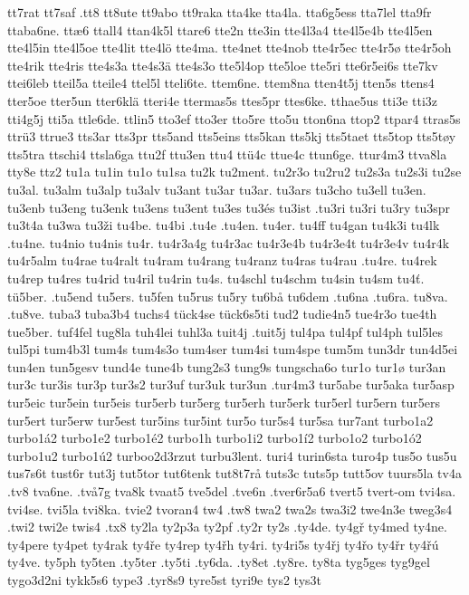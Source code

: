 {{tt7rat
tt7saf
.tt8
tt8ute
tt9abo
tt9raka
tta4ke
tta4la.
tta6g5ess
tta7lel
tta9fr
ttaba6ne.
ttæ6
ttall4
ttan4k5l
ttare6
tte2n
tte3in
tte4l3a4
tte4l5e4b
tte4l5en
tte4l5in
tte4l5oe
tte4lit
tte4lö
tte4ma.
tte4net
tte4nob
tte4r5ec
tte4r5ø
tte4r5oh
tte4rik
tte4ris
tte4s3a
tte4s3ä
tte4s3o
tte5l4op
tte5loe
tte5ri
tte6r5ei6s
tte7kv
ttei6leb
tteil5a
tteile4
ttel5l
tteli6te.
ttem6ne.
ttem8na
tten4t5j
tten5s
ttens4
tter5oe
tter5un
tter6klä
tteri4e
ttermas5s
ttes5pr
ttes6ke.
tthae5us
tti3e
tti3z
tti4g5j
tti5a
ttle6de.
ttlin5
tto3ef
tto3er
tto5re
tto5u
tton6na
ttop2
ttpar4
ttras5s
ttrü3
ttrue3
tts3ar
tts3pr
tts5and
tts5eins
tts5kan
tts5kj
tts5taet
tts5top
tts5tøy
tts5tra
ttschi4
ttsla6ga
ttu2f
ttu3en
ttu4
ttü4c
ttue4c
ttun6ge.
ttur4m3
ttva8la
tty8e
ttz2
tu1a
tu1in
tu1o
tu1sa
tu2k
tu2ment.
tu2r3o
tu2ru2
tu2s3a
tu2s3i
tu2se
tu3al.
tu3alm
tu3alp
tu3alv
tu3ant
tu3ar
tu3ar.
tu3ars
tu3cho
tu3ell
tu3en.
tu3enb
tu3eng
tu3enk
tu3ens
tu3ent
tu3es
tu3és
tu3ist
.tu3ri
tu3ri
tu3ry
tu3spr
tu3t4a
tu3wa
tu3ži
tu4be.
tu4bi
.tu4e
.tu4en.
tu4er.
tu4ff
tu4gan
tu4k3i
tu4lk
.tu4ne.
tu4nio
tu4nis
tu4r.
tu4r3a4g
tu4r3ac
tu4r3e4b
tu4r3e4t
tu4r3e4v
tu4r4k
tu4r5alm
tu4rae
tu4ralt
tu4ram
tu4rang
tu4ranz
tu4ras
tu4rau
.tu4re.
tu4rek
tu4rep
tu4res
tu4rid
tu4ril
tu4rin
tu4s.
tu4schl
tu4schm
tu4sin
tu4sm
tu4ť.
tü5ber.
.tu5end
tu5ers.
tu5fen
tu5rus
tu5ry
tu6bå
tu6dem
.tu6na
.tu6ra.
tu8va.
.tu8ve.
tuba3
tuba3b4
tuchs4
tück4se
tück6s5ti
tud2
tudie4n5
tue4r3o
tue4th
tue5ber.
tuf4fel
tug8la
tuh4lei
tuhl3a
tuit4j
.tuit5j
tul4pa
tul4pf
tul4ph
tul5les
tul5pi
tum4b3l
tum4s
tum4s3o
tum4ser
tum4si
tum4spe
tum5m
tun3dr
tun4d5ei
tun4en
tun5gesv
tund4e
tune4b
tung2s3
tung9s
tungscha6o
tur1o
tur1ø
tur3an
tur3c
tur3is
tur3p
tur3s2
tur3uf
tur3uk
tur3un
.tur4m3
tur5abe
tur5aka
tur5asp
tur5eic
tur5ein
tur5eis
tur5erb
tur5erg
tur5erh
tur5erk
tur5erl
tur5ern
tur5ers
tur5ert
tur5erw
tur5est
tur5ins
tur5int
tur5o
tur5s4
tur5sa
tur7ant
turbo1a2
turbo1á2
turbo1e2
turbo1é2
turbo1h
turbo1i2
turbo1í2
turbo1o2
turbo1ó2
turbo1u2
turbo1ú2
turboo2d3rzut
turbu3lent.
turi4
turin6sta
turo4p
tus5o
tus5u
tus7s6t
tust6r
tut3j
tut5tor
tut6tenk
tut8t7rå
tuts3c
tuts5p
tutt5ov
tuurs5la
tv4a
.tv8
tva6ne.
.två7g
tva8k
tvaat5
tve5del
.tve6n
.tver6r5a6
tvert5
tvert-om
tvi4sa.
tvi4se.
tvi5la
tvi8ka.
tvie2
tvoran4
tw4
.tw8
twa2
twa2s
twa3i2
twe4n3e
tweg3s4
.twi2
twi2e
twis4
.tx8
ty2la
ty2p3a
ty2pf
.ty2r
ty2s
.ty4de.
ty4gř
ty4med
ty4ne.
ty4pere
ty4pet
ty4rak
ty4ře
ty4rep
ty4řh
ty4ri.
ty4ri5s
ty4řj
ty4řo
ty4řr
ty4řú
ty4ve.
ty5ph
ty5ten
.ty5ter
.ty5ti
.ty6da.
.ty8et
.ty8re.
ty8ta
tyg5ges
tyg9gel
tygo3d2ni
tykk5s6
type3
.tyr8s9
tyre5st
tyri9e
tys2
tys3t
}}
